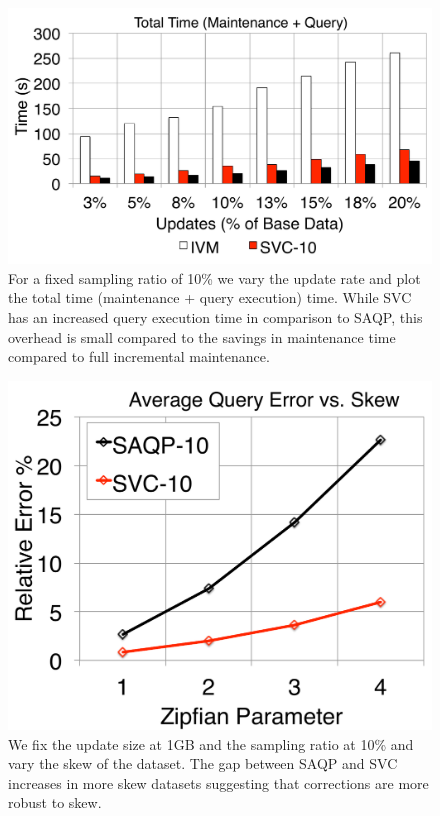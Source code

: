 \begin{figure}[t]
\centering
 \includegraphics[scale=0.16]{exp/msj_4.pdf}
  \caption{For a fixed sampling ratio of 10\% we vary the update rate and plot the total time (maintenance + query execution) time. While SVC has an increased query execution time in comparison to SAQP, this overhead is small compared to the savings in maintenance time compared to full incremental maintenance. \label{exp-1-total}}
\end{figure}

\begin{figure}[t]
\centering
  \includegraphics[scale=0.15]{exp/msj_5.pdf}
 \caption{We fix the update size at 1GB and the sampling ratio at 10\% and vary the skew of the dataset. The gap between SAQP and SVC increases in more skew datasets suggesting that corrections are more robust to skew. \label{exp-1-zipf}}
\end{figure}

